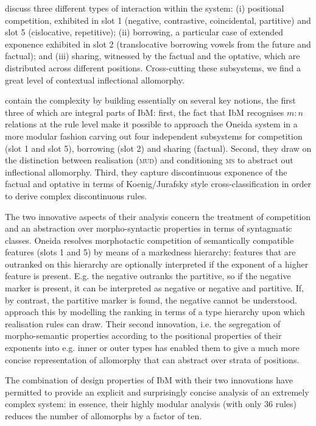 \citet{diaz:koenig:michelson:19} discuss three different types of
interaction within the system: (i) positional competition, exhibited
in slot 1 (negative, contrastive, coincidental, partitive) and slot 5
(cislocative, repetitive); (ii) borrowing, a particular case of extended
exponence exhibited in slot 2 (translocative borrowing vowels from the
future and factual); and (iii) sharing, witnessed by the factual and
the optative, which are distributed across different positions. Cross-cutting these subsystems, we find a great level of
contextual inflectional allomorphy.

\citet{diaz:koenig:michelson:19} contain the complexity by building
essentially on several key notions, the first three of which are
integral parts of IbM: first, the fact that IbM recognises
$m:n$ relations at the rule level make it possible to approach the
Oneida system in a more modular fashion carving out four
independent subsystems for competition (slot 1 and slot 5), borrowing
(slot 2) and sharing (factual). Second, they draw on the distinction
between realisation (\textsc{mud}) and conditioning \textsc{ms} to
abstract out inflectional allomorphy. Third, they capture
discontinuous 
exponence of the factual and optative in terms of Koenig/Jurafsky
style cross-classification in order to derive complex discontinuous
rules.

The two innovative aspects of their analysis concern the treatment of
competition and an abstraction over morpho-syntactic properties in
terms of syntagmatic classes. Oneida resolves morphotactic competition
of semantically compatible features (slots 1 and 5) by means of a
markedness hierarchy: features that are outranked on this hierarchy
are optionally interpreted if the exponent of a higher feature is
present. E.g. the negative outranks the partitive, so if the negative
marker is present, it can be interpreted as negative or negative and
partitive. If, by contrast, the partitive marker is found, the
negative cannot be understood.  \citet{diaz:koenig:michelson:19}
approach this by modelling the ranking in terms of a type hierarchy
upon which realisation rules can draw. Their second innovation, i.e. 
the  segregation of morpho-semantic properties according to
the positional properties of their exponents into e.g. inner or outer
types has enabled them to give a much more concise representation of
allomorphy that can abstract over strata of positions. 

The combination of design properties of IbM with their two innovations
have permitted \citet{diaz:koenig:michelson:19} to provide an explicit
and surprisingly concise analysis of an extremely complex system: in
essence, their highly modular analysis (with only 36 rules) reduces the
number of allomorphs by a factor of ten.

